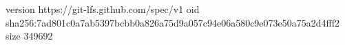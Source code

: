 version https://git-lfs.github.com/spec/v1
oid sha256:7ad801c0a7ab5397bcbb0a826a75d9a057c94e06a580c9e073e50a75a2d4fff2
size 349692
